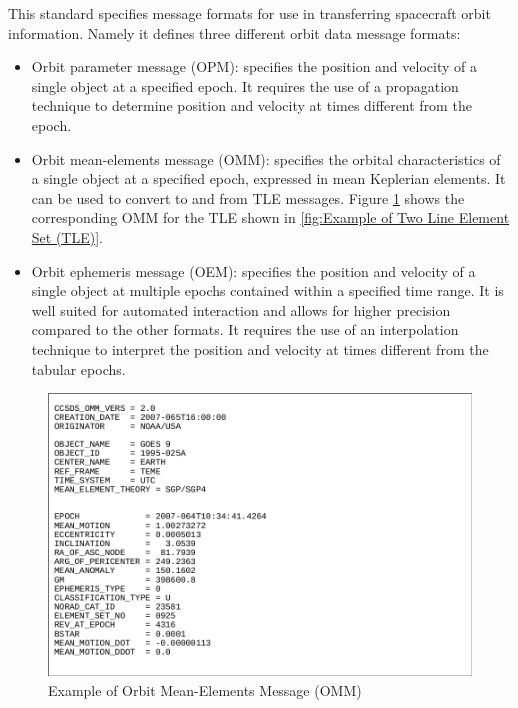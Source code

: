 This standard specifies message formats for use in transferring spacecraft orbit information. Namely it defines three different orbit data message formats:

\begin{itemize}
\item Orbit parameter message (OPM): specifies the position and velocity of a single object at a specified epoch. It requires the use of a propagation technique to determine position and velocity at times different from the epoch.
\item Orbit mean-elements message (OMM): specifies the orbital characteristics of a single object at a specified epoch, expressed in mean Keplerian elements. It can be used to convert to and from TLE messages. Figure \ref{fig:Example of Orbit Mean-Elements Message (OMM)} shows the corresponding OMM for the TLE shown in \ref{fig:Example of Two Line Element Set (TLE)}.
\item Orbit ephemeris message (OEM): specifies the position and velocity of a single object at multiple epochs contained within a specified time range. It is well suited for automated interaction and allows for higher precision compared to the other formats. It requires the use of an interpolation technique to interpret the position and velocity at times different from the tabular epochs. 
\end{itemize}

\begin{figure}[h]
\centering\includegraphics[scale=0.35]{fig/example_of_omm}
\caption{Example of Orbit Mean-Elements Message (OMM)}
\label{fig:Example of Orbit Mean-Elements Message (OMM)}
\end{figure}

